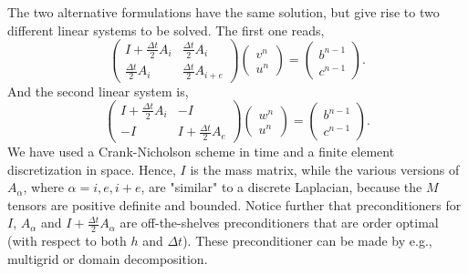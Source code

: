 \documentclass{report}
\begin{document}
The two alternative formulations have the
same solution, but give rise to two different
linear systems to be solved. The first one
reads,
\begin{equation}
\begin{pmatrix}
I+\frac{\Delta t}{2}A_i & \frac{\Delta t}{2}A_i\\
\frac{\Delta t}{2}A_i &\frac{\Delta t}{2}A_{i+e}
\end{pmatrix}
\begin{pmatrix}
v^n \\ u^n
\end{pmatrix}
=
\begin{pmatrix}
b^{n-1} \\ c^{n-1}
\end{pmatrix} .
\label{first:matrix}
\end{equation}
And the second linear system is,
\begin{equation}
\begin{pmatrix}
I+\frac{\Delta t}{2}A_i & -I \\
-I & I + \frac{\Delta t}{2}A_{e}
\end{pmatrix}
\begin{pmatrix}
w^n \\ u^n
\end{pmatrix}
=
\begin{pmatrix}
b^{n-1} \\ c^{n-1}
\end{pmatrix} .
\label{second:matrix}
\end{equation}
We have used a Crank-Nicholson scheme in time and
a finite element discretization in space.
Hence, $I$ is the mass matrix, while the various versions of $A_\alpha$,
where $\alpha=i,e,i+e$,
are "similar" to a discrete Laplacian, because the $M$ tensors
are positive definite and bounded. Notice further that
preconditioners for $I$, $A_\alpha$ and
$I + \frac{\Delta t}{2}A_\alpha$ are off-the-shelves
preconditioners that are order optimal
(with respect to both $h$ and $\Delta t$). These preconditioner can be
made by e.g., multigrid
or domain decomposition.
\end{document}
